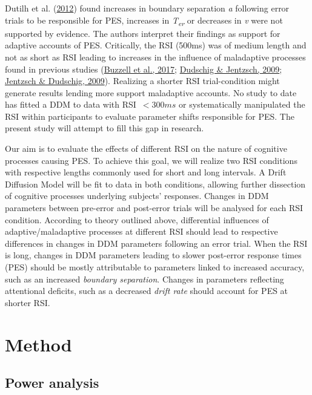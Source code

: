 \documentclass[
  man,floatsintext]{apa7}
\begin{document}
Dutilh et al. (\protect\hyperlink{ref-dutilh2012testing}{2012}) found increases in boundary separation \emph{a} following error trials to be responsible for PES, increases in \emph{T\textsubscript{er}} or decreases in \emph{v} were not supported by evidence. The authors interpret their findings as support for adaptive accounts of PES. Critically, the RSI (500ms) was of medium length and not as short as RSI leading to increases in the influence of maladaptive processes found in previous studies (\protect\hyperlink{ref-buzzel2017}{Buzzell et al., 2017}; \protect\hyperlink{ref-dudschig2009}{Dudschig \& Jentzsch, 2009}; \protect\hyperlink{ref-jentzsch2009}{Jentzsch \& Dudschig, 2009}). Realizing a shorter RSI trial-condition might generate results lending more support maladaptive accounts. No study to date has fitted a DDM to data with RSI~\(< 300ms\) or systematically manipulated the RSI within participants to evaluate parameter shifts responsible for PES. The present study will attempt to fill this gap in research.

Our aim is to evaluate the effects of different RSI on the nature of cognitive processes causing PES. To achieve this goal, we will realize two RSI conditions with respective lengths commonly used for short and long intervals. A Drift Diffusion Model will be fit to data in both conditions, allowing further dissection of cognitive processes underlying subjects' responses. Changes in DDM parameters between pre-error and post-error trials will be analysed for each RSI condition. According to theory outlined above, differential influences of adaptive/maladaptive processes at different RSI should lead to respective differences in changes in DDM parameters following an error trial. When the RSI is long, changes in DDM parameters leading to slower post-error response times (PES) should be mostly attributable to parameters linked to increased accuracy, such as an increased \emph{boundary separation}. Changes in parameters reflecting attentional deficits, such as a decreased \emph{drift rate} should account for PES at shorter RSI.

\hypertarget{method}{%
\section{Method}\label{method}}

\hypertarget{power-analysis}{%
\subsection{Power analysis}\label{power-analysis}}
\end{document}

